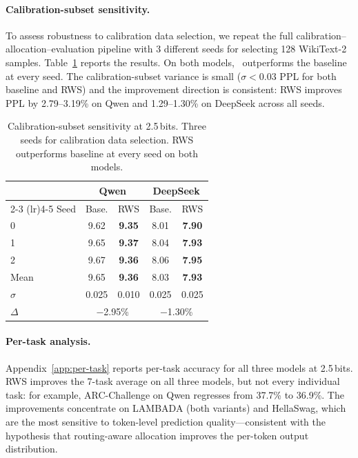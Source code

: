 \paragraph{Calibration-subset sensitivity.}
To assess robustness to calibration data selection, we repeat the full calibration--allocation--evaluation pipeline with 3 different seeds for selecting 128 WikiText-2 samples. Table~\ref{tab:seed} reports the results. On both models, \method\ outperforms the baseline at every seed. The calibration-subset variance is small ($\sigma < 0.03$ PPL for both baseline and RWS) and the improvement direction is consistent: RWS improves PPL by 2.79--3.19\% on Qwen and 1.29--1.30\% on DeepSeek across all seeds.

\begin{table}[t]
\centering
\small
\caption{Calibration-subset sensitivity at 2.5\,bits. Three seeds for calibration data selection. RWS outperforms baseline at every seed on both models.}
\label{tab:seed}
\begin{tabular}{lcccc}
\toprule
& \multicolumn{2}{c}{Qwen} & \multicolumn{2}{c}{DeepSeek} \\
\cmidrule(lr){2-3} \cmidrule(lr){4-5}
Seed & Base. & RWS & Base. & RWS \\
\midrule
0 & 9.62 & \textbf{9.35} & 8.01 & \textbf{7.90} \\
1 & 9.65 & \textbf{9.37} & 8.04 & \textbf{7.93} \\
2 & 9.67 & \textbf{9.36} & 8.06 & \textbf{7.95} \\
\midrule
Mean & 9.65 & \textbf{9.36} & 8.03 & \textbf{7.93} \\
$\sigma$ & 0.025 & 0.010 & 0.025 & 0.025 \\
$\Delta$ & \multicolumn{2}{c}{$-$2.95\%} & \multicolumn{2}{c}{$-$1.30\%} \\
\bottomrule
\end{tabular}
\end{table}

\paragraph{Per-task analysis.}
Appendix~\ref{app:per-task} reports per-task accuracy for all three models at 2.5\,bits. RWS improves the 7-task average on all three models, but not every individual task: for example, ARC-Challenge on Qwen regresses from 37.7\% to 36.9\%. The improvements concentrate on LAMBADA (both variants) and HellaSwag, which are the most sensitive to token-level prediction quality---consistent with the hypothesis that routing-aware allocation improves the per-token output distribution.

